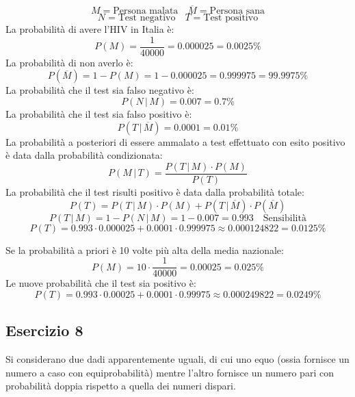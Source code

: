\documentclass[a4paper]{article}
\theoremstyle{break}
\theoremstyle{break}
\theoremstyle{break}
\theoremstyle{break}
\begin{document}
\vspace{1em}
\[
	M = \text{Persona malata} \quad \overline{M} = \text{Persona sana}
\]
\[
	N = \text{Test negativo} \quad T = \text{Test positivo}
\]
\noindent La probabilità di avere l'HIV in Italia è:
\[
	P(M) = \frac{1}{40000} = 0.000025 = 0.0025\%
\]
La probabilità di non averlo è:
\[
	P(\overline{M}) = 1 - P(M) = 1 - 0.000025 = 0.999975 = 99.9975\%
\]
La probabilità che il test sia falso negativo è:
\[
	P(N\,|\,M) = 0.007 = 0.7\%
\]
La probabilità che il test sia falso positivo è:
\[
	P(T\,|\,\overline{M}) = 0.0001 = 0.01\%
\]
La probabilità a posteriori di essere ammalato a test effettuato con esito positivo è
data dalla probabilità condizionata:
\[
	P(M\,|\,T) = \frac{P(T\,|\,M) \cdot P(M)}{P(T)}
\]
La probabilità che il test risulti positivo è data dalla probabilità totale:
\[
	P(T) = P(T\,|\,M) \cdot P(M) + P(T\,|\,\overline{M}) \cdot P(\overline{M})
\]
\[
	P(T\,|\,M) = 1 - P(N\,|\,M) = 1 - 0.007 = 0.993 \quad \text{Sensibilità}
\]
\[
	P(T) = 0.993 \cdot 0.000025 + 0.0001 \cdot 0.999975 \approx 0.000124822 = 0.0125\%
\]

\vspace{1em}
\noindent Se la probabilità a priori è 10 volte più alta della media nazionale:
\[
	P(M) = 10 \cdot \frac{1}{40000} = 0.00025 = 0.025\%
\]
Le nuove probabilità che il test sia positivo è:
\[
	P(T) = 0.993 \cdot 0.00025 + 0.0001 \cdot 0.99975 \approx 0.000249822 = 0.0249\%
\]

\subsection{Esercizio 8}
Si considerano due dadi apparentemente uguali, di cui uno equo (ossia fornisce un numero
a caso con equiprobabilità) mentre l’altro fornisce un numero pari con probabilità doppia
rispetto a quella dei numeri dispari.
\end{document}
